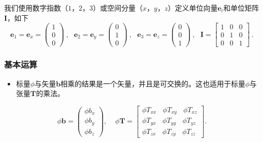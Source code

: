 \documentclass[MathematicsNumericsDerivationsAndOpenFOAM.tex]{subfiles}
\begin{document}
	我们使用数字指数（$1$，$2$，$3$）或空间分量（$x$，$y$，$z$）定义单位向量$\textbf{e}_i$和单位矩阵$\textbf{I}$，如下
%
%
\begin{equation*}
\textbf{e}_1 = \textbf{e}_x = \left( \begin{matrix}   1 \\ 0 \\ 0  \end{matrix}  \right)
~,~~~
\textbf{e}_2= \textbf{e}_y = \left( \begin{matrix}   0 \\ 1 \\ 0  \end{matrix}  \right)
~,~~~
\textbf{e}_3= \textbf{e}_z = \left( \begin{matrix}   0 \\ 0 \\ 1  \end{matrix}  \right)
~,~~~
\textbf{I} = \left[ \begin{matrix}   1 & 0 & 0 \\ 0 & 1 & 0 \\ 0 & 0 & 1  \end{matrix}  \right] ~.
\end{equation*}
%
%
%
\subsubsection{基本运算}
%
%
\begin{itemize}
    \item 标量$\phi$与矢量$\textbf{b}$相乘的结果是一个矢量，并且是可交换的。这也适用于标量$\phi$与张量$\textbf{T}$的乘法。
\end{itemize}
%
%
\begin{equation}
  \phi \textbf{b} =
  \left(
  \begin{matrix}
    \phi b_x \\ \phi b_y \\ \phi b_z
  \end{matrix}
  \right)
  ,~~~~~
  \phi\textbf{T}
=
  \left[
  \begin{matrix}
   \phi T_{xx} ~ ~ ~ ~ \phi T_{xy} ~ ~ ~ ~ \phi T_{xz} \\
   \phi T_{yx} ~ ~ ~ ~ \phi T_{yy} ~ ~ ~ ~ \phi T_{yz} \\
   \phi T_{zx} ~ ~ ~ ~ \phi T_{zy} ~ ~ ~ ~ \phi T_{zz}
  \end{matrix}
  \right].
\label{EQUATION::simple}
\end{equation}
%
%
%
%
\end{document}
